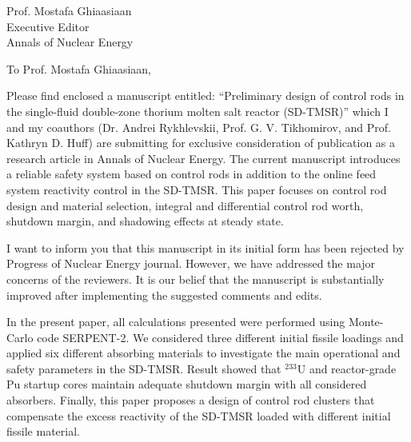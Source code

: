 \documentclass[11pt]{letter} %
\newcommand{\RecipientName}{Prof. Mostafa Ghiaasiaan\xspace}
\newcommand{\RecipientAddress}{Executive Editor\\Annals of Nuclear Energy}
\begin{document}
	
	
	
	\begin{letter}{\RecipientName\\
			\RecipientAddress\xspace}
		
		\address{O. Ashraf\\
			oabdelaziz@mephi.ru\\
			osama.ashraf@edu.asu.edu.eg\\
			Institute of Nuc. Physics and Eng.\\
			National Research Nuclear University\\
			Moscow, Russia, 115409}
		
		
		\opening{To \RecipientName,}
		
		Please find enclosed a manuscript entitled: ``Preliminary design of control rods in the single-fluid double-zone thorium molten salt reactor (SD-TMSR)'' which I and my coauthors (Dr. Andrei Rykhlevskii, Prof. G. V. Tikhomirov, and Prof. Kathryn D. Huff) are submitting for exclusive consideration of publication as a research article in Annals of Nuclear Energy. The current manuscript introduces a reliable safety system based on control rods in addition to the online feed system reactivity control in the SD-TMSR. This paper focuses on control rod design and material selection, integral and differential control rod worth, shutdown margin, and shadowing effects at steady state.
		
		I want to inform you that this manuscript in its initial form has been rejected by Progress of Nuclear Energy journal. However, we have addressed the major concerns of the reviewers. It is our belief that the manuscript is substantially improved after implementing the suggested comments and edits.
		
		In the present paper, all calculations presented were performed using Monte-Carlo code SERPENT-2. We considered three different initial fissile loadings and applied six different absorbing materials to investigate the main operational and safety parameters in the SD-TMSR. Result showed that $^{233}$U and reactor-grade Pu startup cores maintain adequate shutdown margin with all considered absorbers. Finally, this paper proposes a design of control rod clusters that compensate the excess reactivity of the SD-TMSR loaded with different initial fissile material.
		

\end{letter}
\end{document}
